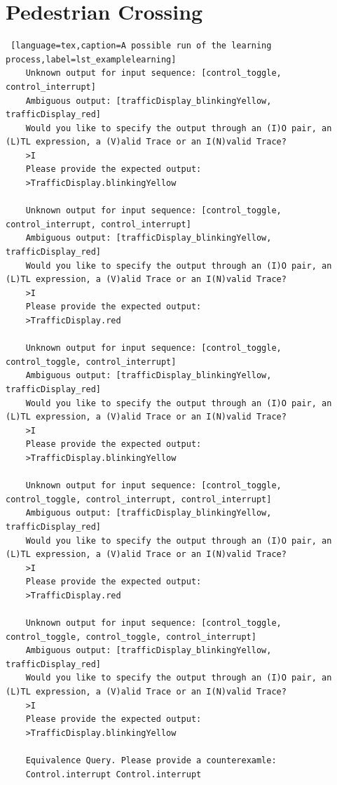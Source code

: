 \chapter{Pedestrian Crossing}
\bigskip
\begin{lstlisting} [language=tex,caption=A possible run of the learning process,label=lst_examplelearning]
	Unknown output for input sequence: [control_toggle, control_interrupt]
	Ambiguous output: [trafficDisplay_blinkingYellow, trafficDisplay_red]
	Would you like to specify the output through an (I)O pair, an (L)TL expression, a (V)alid Trace or an I(N)valid Trace?
	>I
	Please provide the expected output:
	>TrafficDisplay.blinkingYellow
	
	Unknown output for input sequence: [control_toggle, control_interrupt, control_interrupt]
	Ambiguous output: [trafficDisplay_blinkingYellow, trafficDisplay_red]
	Would you like to specify the output through an (I)O pair, an (L)TL expression, a (V)alid Trace or an I(N)valid Trace?
	>I
	Please provide the expected output:
	>TrafficDisplay.red
	
	Unknown output for input sequence: [control_toggle, control_toggle, control_interrupt]
	Ambiguous output: [trafficDisplay_blinkingYellow, trafficDisplay_red]
	Would you like to specify the output through an (I)O pair, an (L)TL expression, a (V)alid Trace or an I(N)valid Trace?
	>I
	Please provide the expected output:
	>TrafficDisplay.blinkingYellow
	
	Unknown output for input sequence: [control_toggle, control_toggle, control_interrupt, control_interrupt]
	Ambiguous output: [trafficDisplay_blinkingYellow, trafficDisplay_red]
	Would you like to specify the output through an (I)O pair, an (L)TL expression, a (V)alid Trace or an I(N)valid Trace?
	>I
	Please provide the expected output:
	>TrafficDisplay.red
	
	Unknown output for input sequence: [control_toggle, control_toggle, control_toggle, control_interrupt]
	Ambiguous output: [trafficDisplay_blinkingYellow, trafficDisplay_red]
	Would you like to specify the output through an (I)O pair, an (L)TL expression, a (V)alid Trace or an I(N)valid Trace?
	>I
	Please provide the expected output:
	>TrafficDisplay.blinkingYellow
	
	Equivalence Query. Please provide a counterexamle:
	Control.interrupt Control.interrupt
	

\end{lstlisting}
